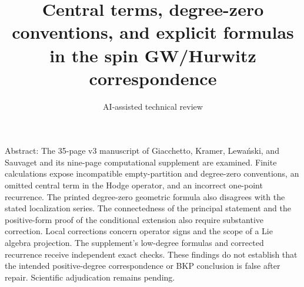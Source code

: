 \documentclass[10pt]{article}
\title{Central terms, degree-zero conventions, and explicit formulas in the spin GW/Hurwitz correspondence}
\author{AI-assisted technical review}
\date{}
\begin{document}
\maketitle
Abstract: The 35-page v3 manuscript of Giacchetto, Kramer, Lewański, and Sauvaget and its nine-page computational supplement are examined. Finite calculations expose incompatible empty-partition and degree-zero conventions, an omitted central term in the Hodge operator, and an incorrect one-point recurrence. The printed degree-zero geometric formula also disagrees with the stated localization series. The connectedness of the principal statement and the positive-form proof of the conditional extension also require substantive correction. Local corrections concern operator signs and the scope of a Lie algebra projection. The supplement’s low-degree formulas and corrected recurrence receive independent exact checks. These findings do not establish that the intended positive-degree correspondence or BKP conclusion is false after repair. Scientific adjudication remains pending.\par
\end{document}
